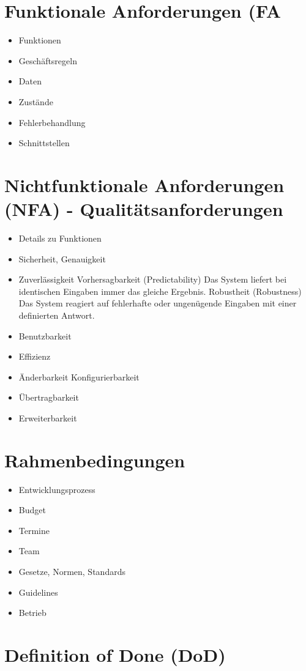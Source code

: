 \section{Funktionale Anforderungen (FA}
\label{sec:functionalrequirements}
    \begin{itemize}
        \item Funktionen
        \item Geschäftsregeln
        \item Daten 
        \item Zustände
        \item Fehlerbehandlung
        \item Schnittstellen
    \end{itemize}

\section{Nichtfunktionale Anforderungen (NFA) - Qualitätsanforderungen}
\label{sec:nonfunctionalrequirements}
    \begin{itemize}
        \item Details zu Funktionen
        \item Sicherheit, Genauigkeit
        \item Zuverlässigkeit 
        \SubItem Vorhersagbarkeit (Predictability)
        \subitem Das System liefert bei identischen Eingaben immer das gleiche Ergebnis.
        \SubItem Robustheit (Robustness)
        \subitem Das System reagiert auf fehlerhafte oder ungenügende Eingaben mit einer definierten Antwort.
        \item Benutzbarkeit 
        \item Effizienz 
        \item Änderbarkeit 
        \SubItem Konfigurierbarkeit  
        \item Übertragbarkeit 
        \item Erweiterbarkeit
    \end{itemize}

\section{Rahmenbedingungen}
\label{sec:framingconditions}
    \begin{itemize}
        \item Entwicklungsprozess 
        \item Budget 
        \item Termine
        \item Team 
        \item Gesetze, Normen, Standards
        \item Guidelines
        \item Betrieb
    \end{itemize}

\section{Definition of Done (DoD)}
\label{sec:definitionofdone}
